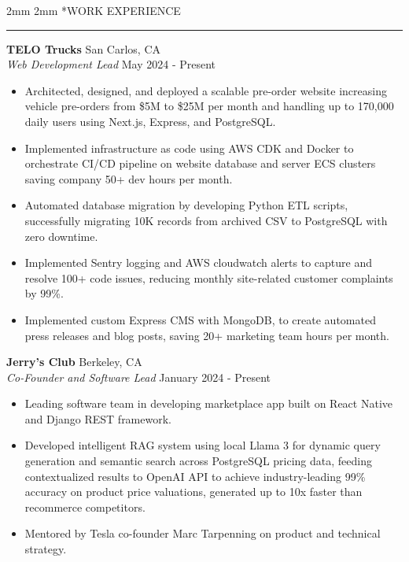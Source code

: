 \documentclass[11pt,a4paper]{article}
\makeatletter
\renewcommand\section{\@startsection{section}{1}{0pt}%
  {2mm}%
  {2mm}%
  {\normalsize\bfseries}}%
\newcommand{\sectionline}{%
  \hrule
  \vspace{4mm}%
}
\makeatother
\begin{document}
\section*{WORK EXPERIENCE}
\sectionline
\noindent\textbf{TELO Trucks} \hfill San Carlos, CA\\
\textit{Web Development Lead} \hfill May 2024 - Present
\begin{itemize}[itemsep=0pt]
\item Architected, designed, and deployed a scalable pre-order website increasing vehicle pre-orders from \$5M to \$25M per month and handling up to 170,000 daily users using Next.js, Express, and PostgreSQL.
\item Implemented infrastructure as code using AWS CDK and Docker to orchestrate CI/CD pipeline on website database and server ECS clusters saving company 50+ dev hours per month.
\item Automated database migration by developing Python ETL scripts, successfully migrating 10K records from archived CSV to PostgreSQL with zero downtime.
\item Implemented Sentry logging and AWS cloudwatch alerts to capture and resolve 100+ code issues, reducing monthly site-related customer complaints by 99\%.
\item Implemented custom Express CMS with MongoDB, to create automated press releases and blog posts, saving 20+ marketing team hours per month.
\end{itemize}

\noindent\textbf{Jerry's Club} \hfill Berkeley, CA\\
\textit{Co-Founder and Software Lead} \hfill January 2024 - Present
\begin{itemize}[itemsep=0pt]
\item Leading software team in developing marketplace app built on React Native and Django REST framework.
\item Developed intelligent RAG system using local Llama 3 for dynamic query generation and semantic search across PostgreSQL pricing data, feeding contextualized results to OpenAI API to achieve industry-leading 99\% accuracy on product price valuations, generated up to 10x faster than recommerce competitors.
\item Mentored by Tesla co-founder Marc Tarpenning on product and technical strategy.
\end{itemize}
\end{document}
